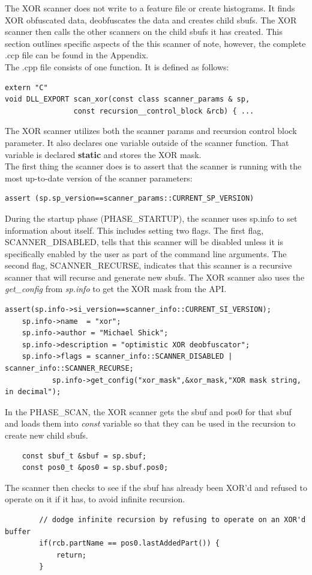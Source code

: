 \documentclass[11pt,fleqn]{article} %
\begin{document}
The XOR scanner does not write to a feature file or create histograms. It finds XOR obfuscated data, deobfuscates the data and creates child sbufs. The XOR scanner then calls the other scanners on the child sbufs it has created. This section outlines specific aspects of the this scanner of note, however, the complete .ccp file can be found in the Appendix. \\

The .cpp file consists of one function. It is defined as follows:
\begin{lstlisting}
extern "C"
void DLL_EXPORT scan_xor(const class scanner_params & sp, 
				const recursion__control_block &rcb) { ...
\end{lstlisting}
The XOR scanner utilizes both the scanner params and recursion control block parameter.  It also declares one variable outside of the scanner function. That variable is declared \textbf{static} and stores the XOR mask. \\

The first thing the scanner does is to assert that the scanner is running with the most up-to-date version of the scanner parameters:
\begin{lstlisting}
assert (sp.sp_version==scanner_params::CURRENT_SP_VERSION)
\end{lstlisting}

During the startup phase (PHASE\_STARTUP), the scanner uses sp.info to set information about itself. This includes setting two flags. The first flag, SCANNER\_DISABLED, tells \bulk that this scanner will be disabled unless it is specifically enabled by the user as part of the command line arguments. The second flag, SCANNER\_RECURSE, indicates that this scanner is a recursive scanner that will recurse and generate new sbufs. The XOR scanner also uses the \textit{get\_config} from \textit{sp.info} to get the XOR mask from the API.   
\begin{lstlisting}
assert(sp.info->si_version==scanner_info::CURRENT_SI_VERSION);
	sp.info->name  = "xor";
	sp.info->author = "Michael Shick";
	sp.info->description = "optimistic XOR deobfuscator";
	sp.info->flags = scanner_info::SCANNER_DISABLED | scanner_info::SCANNER_RECURSE;
           sp.info->get_config("xor_mask",&xor_mask,"XOR mask string, in decimal");
\end{lstlisting}

In the PHASE\_SCAN, the XOR scanner gets the sbuf and pos0 for that sbuf and loads them into \textit{const} variable so that they can be used in the recursion to create new child sbufs. 
\begin{lstlisting}
	const sbuf_t &sbuf = sp.sbuf;
	const pos0_t &pos0 = sp.sbuf.pos0;
\end{lstlisting}
The scanner then checks to see if the sbuf has already been XOR'd and refused to operate on it if it has, to avoid infinite recursion.
\begin{lstlisting}
        // dodge infinite recursion by refusing to operate on an XOR'd buffer
        if(rcb.partName == pos0.lastAddedPart()) {
            return;
        }
\end{lstlisting}
\end{document}
